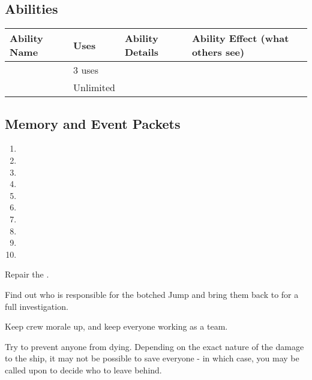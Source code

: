 \documentclass[char]{TMFHope}
\begin{document}
\subsection*{Abilities}
\begin{tabular}{|p{3cm}|p{1.5cm}|p{8cm}|p{3.5cm}|} 
 \hline
 \textbf{Ability Name} & \textbf{Uses} & \textbf{Ability Details} & \textbf{Ability Effect (what others see)} \\ 
\hline
 \aTruth{\MYname} & 3 uses & \aTruth{\MYtext} & \aTruth{\MYeffect} \\
\hline
 \aCalculate{\MYname} & Unlimited & \aCalculate{\MYtext} & \aCalculate{\MYeffect} \\ 
 \hline
\end{tabular}

\subsection*{Memory and Event Packets}
\begin{enumerate}
	\item \mCAlpha{\MYname}
	\item \mBroom{\MYname}
	\item \mLab{\Myname}
	\item \mPatient{\MYname}
	\item \mKitchen{\MYname}
	\item \mWeight{\MYname}
	\item \mTheater{\MYname}
	\item \mCrates{\MYname}
	\item \mCaptainOne{\MYname}
	\item \mPractice{\MYname}	
\end{enumerate}

\begin{itemz}[Goals]
	\item Repair the \pNew{}.
	\item Find out who is responsible for the botched Jump and bring them back to \pHome{} for a full investigation.
	\item Keep crew morale up, and keep everyone working as a team.
	\item Try to prevent anyone from dying. Depending on the exact nature of the damage to the ship, it may not be possible to save everyone - in which case, you may be called upon to decide who to leave behind.
\end{itemz}
\end{document}
